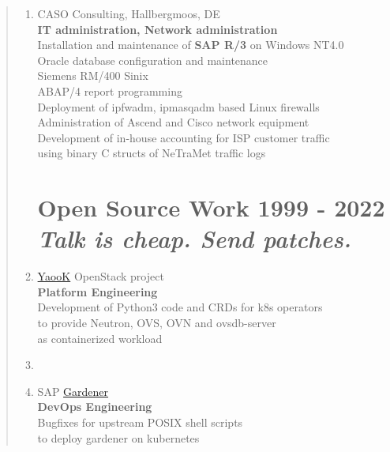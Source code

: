\documentclass[a4paper]{report}
\begin{document}
\begin{quote}
\begin{enumerate}
\item[1999]         CASO Consulting, Hallbergmoos, DE\\
                    \textbf{IT administration, Network administration}\\
                    Installation and maintenance of \textbf{SAP R/3} on Windows NT4.0\\
                    Oracle database configuration and maintenance\\
                    Siemens RM/400 Sinix\\
                    ABAP/4 report programming\\
                    Deployment of ipfwadm, ipmasqadm based Linux firewalls\\
                    Administration of Ascend and Cisco network equipment\\
                    Development of in-house accounting for ISP customer traffic\\
                    using binary C structs of NeTraMet traffic logs

\clearpage

\begin{flushleft}
\section*{Open Source Work 1999 - 2022 \\ \textit{Talk is cheap. Send patches.}}
\end{flushleft}

\item[2022]         \href{https://yaook.cloud}{YaooK} OpenStack project\\
                    \textbf{Platform Engineering}\\
                    Development of Python3 code and CRDs for k8s operators\\
                    to provide Neutron, OVS, OVN and ovsdb-server\\
                    as containerized workload

\item[]

\item[2021]         SAP \href{https://gardener.cloud}{Gardener}\\
                    \textbf{DevOps Engineering}\\
                    Bugfixes for upstream POSIX shell scripts\\
                    to deploy gardener on kubernetes


\end{enumerate}
\end{quote}
\end{document}
